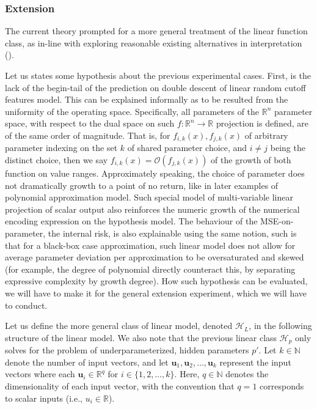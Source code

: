 \documentclass[
  journal=largetwo,
  year=2025,
  volume=37,
]{cup-journal}
\begin{document}
\subsubsection{Extension}

The current theory prompted for a more general treatment of the linear function class, as in-line with exploring reasonable existing alternatives in interpretation (\cite{nakkiran2019datahurtlinearregression}).

Let us states some hypothesis about the previous experimental cases. First, is the lack of the begin-tail of the prediction on double descent of linear random cutoff features model. This can be explained informally as to be resulted from the uniformity of the operating space. Specifically, all parameters of the $\mathbb{R}^{n}$ parameter space, with respect to the dual space on such $f:\mathbb{R}^{n}\to\mathbb{R}$ projection is defined, are of the same order of magnitude. That is, for $f_{i,k}(x),f_{j,k}(x)$ of arbitrary parameter indexing on the set $k$ of shared parameter choice, and $i\neq j$ being the distinct choice, then we say $f_{i,k}(x)=\mathcal{O}(f_{j,k}(x))$ of the growth of both function on value ranges. Approximately speaking, the choice of parameter does not dramatically growth to a point of no return, like in later examples of polynomial approximation model. Such special model of multi-variable linear projection of scalar output also reinforces the numeric growth of the numerical encoding expression on the hypothesis model. The behaviour of the MSE-on-parameter, the internal risk, is also explainable using the same notion, such is that for a black-box case approximation, such linear model does not allow for average parameter deviation per approximation to be oversaturated and skewed (for example, the degree of polynomial directly counteract this, by separating expressive complexity by growth degree). How such hypothesis can be evaluated, we will have to make it for the general extension experiment, which we will have to conduct. 

Let us define the more general class of linear model, denoted $\mathcal{H}_{L}$, in the following structure of the linear model. We also note that the previous linear class $\mathcal{H}_{p}$ only solves for the problem of underparameterized, hidden parameters $p'$. Let $k \in \mathbb{N}$ denote the number of input vectors, and let $\mathbf{u}_1, \mathbf{u}_2, \ldots, \mathbf{u}_k$ represent the input vectors where each $\mathbf{u}_i \in \mathbb{R}^{q}$ for $i \in \{1, 2, \ldots, k\}$. Here, $q \in \mathbb{N}$ denotes the dimensionality of each input vector, with the convention that $q = 1$ corresponds to scalar inputs (i.e., $u_i \in \mathbb{R}$).
\end{document}
